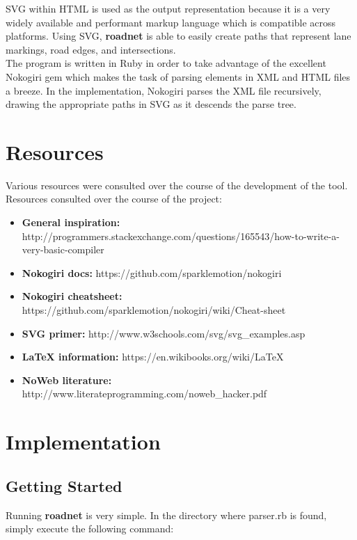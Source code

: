 \documentclass{article}
\begin{document}
SVG within HTML is used as the output representation because it is a very widely available and performant markup language which is compatible across platforms. Using SVG, \textbf{roadnet} is able to easily create paths that represent lane markings, road edges, and intersections.\\

The program is written in Ruby in order to take advantage of the excellent Nokogiri gem which makes the task of parsing elements in XML and HTML files a breeze. In the implementation, Nokogiri parses the XML file recursively, drawing the appropriate paths in SVG as it descends the parse tree.

\section{Resources}
Various resources were consulted over the course of the development of the tool. \\

Resources consulted over the course of the project:
\begin{itemize}  
\item \textbf{General inspiration:} http://programmers.stackexchange.com/questions/165543/how-to-write-a-very-basic-compiler
\item \textbf{Nokogiri docs:} https://github.com/sparklemotion/nokogiri
\item \textbf{Nokogiri cheatsheet:} https://github.com/sparklemotion/nokogiri/wiki/Cheat-sheet
\item \textbf{SVG primer:} http://www.w3schools.com/svg/svg\_examples.asp
\item \textbf{LaTeX information:} https://en.wikibooks.org/wiki/LaTeX
\item \textbf{NoWeb literature:} http://www.literateprogramming.com/noweb\_hacker.pdf
\end{itemize}

\section{Implementation}

\subsection{Getting Started}

Running \textbf{roadnet} is very simple. In the directory where parser.rb is found, simply execute the following command:\\
\end{document}
